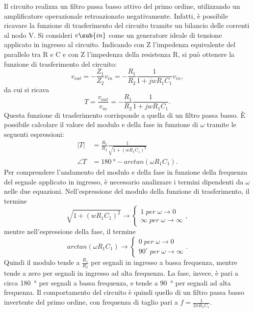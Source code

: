 Il circuito realizza un filtro passa basso attivo del primo ordine, utilizzando un amplificatore operazionale retroazionato negativamente. Infatti, è possibile ricavare la funzione di trasferimento del circuito tramite un bilancio delle correnti al nodo V\super{-}. Si consideri $v\sub{in}$ come un generatore ideale di tensione applicato in ingresso al circuito. Indicando con Z l'impedenza equivalente del parallelo tra R e C e con Z l'impedenza della resistenza R, si può ottenere la funzione di trasferimento del circuito:
\begin{equation}
	v_{out}=-\frac{Z_1}{Z_2}v_{in}=-\frac{R_1}{R_2}\frac{1}{1+j w R_1 C_1} v_{in},
\end{equation}
da cui si ricava
\begin{equation}
	T=\frac{v_{out}}{v_{in}}=-\frac{R_1}{R_2}\frac{1}{1+j w R_1 C_1}.
\end{equation}
Questa funzione di trasferimento corrisponde a quella di un filtro passa basso. È possibile calcolare il valore del modulo e della fase in funzione di $\omega$ tramite le seguenti espressioni:
\begin{equation}
	\begin{split}
		|T|&=\frac{R_1}{R_2}\frac{1}{\sqrt{1+(wR_1C_1)^2}} \\
		\angle T&=\SI{180}{\degree}-arctan(\omega R_1 C_1).
	\end{split}
	\label{eq:1.3}
\end{equation}
Per comprendere l'andamento del modulo e della fase in funzione della frequenza del segnale applicato in ingresso, è necessario analizzare i termini dipendenti da $\omega$ nelle due equazioni. Nell'espressione del modulo della funzione di trasferimento, il termine 
\begin{equation}
	\sqrt{1+(wR_1C_1)^2} \to
	\begin{cases}
		1 \; per \; \omega \to 0 \\
		\infty \; per \; \omega \to \infty
	\end{cases}
,
\end{equation}
mentre nell'espressione della fase, il termine
\begin{equation}
	arctan(\omega R_1 C_1) \to
	\begin{cases}
		0 \; per \; \omega \to 0 \\
		90^\circ \; per \; \omega \to \infty
	\end{cases}
	.
\end{equation}
Quindi il modulo tende a $\frac{R_1}{R_2}$ per segnali in ingresso a bassa frequenza, mentre tende a zero per segnali in ingresso ad alta frequenza. La fase, invece, è pari a circa \SI{180}{\degree} per segnali a bassa frequenza, e tende a \SI{90}{\degree} per segnali ad alta frequenza.
Il comportamento del circuito è quindi quello di un filtro passa basso invertente del primo ordine, con frequenza di taglio pari a $f=\frac{1}{2\pi R_1C_1}$.

